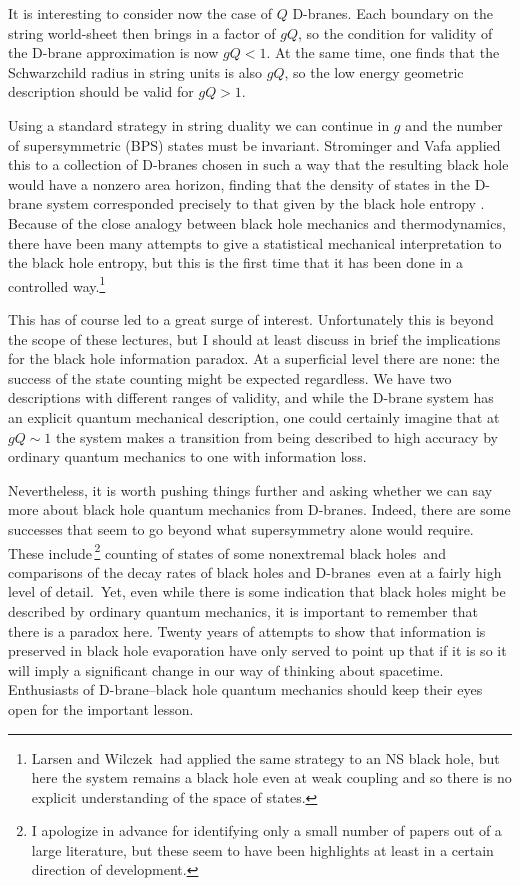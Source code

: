 \documentclass[12pt]{article}
\begin{document}
It is interesting to consider now the case of $Q$ D-branes.  Each boundary on
the string world-sheet then brings in a factor of $gQ$, so the condition for
validity of the D-brane approximation is now $gQ < 1$.  At the same time, one
finds that the Schwarzchild radius in string units is also $gQ$, so the
low energy geometric description should be valid for $gQ > 1$.

Using a standard strategy in string duality we can continue in $g$ and the
number of supersymmetric (BPS) states must be invariant.  Strominger and Vafa
applied this to a collection of D-branes chosen in such a way that the
resulting black hole would have a nonzero area horizon, finding that the
density of states in the D-brane system corresponded precisely to that given
by the black hole entropy \cite{sv}.  Because of the close analogy between
black hole mechanics and thermodynamics, there have been many attempts to
give a statistical mechanical interpretation to the black hole entropy, but
this is the first time that it has been done in a controlled way.\footnote
{Larsen and Wilczek\, \cite{larwil} had applied the same strategy to an NS black
hole, but here the system remains a black hole even at weak coupling and so
there is no explicit understanding of the space of states.}

This has of course led to a great surge of interest.  Unfortunately this
is beyond the scope of these lectures, but I should at least discuss in brief
the implications for the black hole information paradox.  At a superficial
level there are none: the success of the state counting might be expected
regardless.  We have two descriptions with different ranges of validity, and
while the D-brane system has an explicit quantum mechanical description, one
could certainly imagine that at
$gQ \sim 1$ the system makes a transition from being described to high accuracy
by ordinary quantum mechanics to one with information loss.

Nevertheless, it
is worth pushing things further and asking whether we can say more about black
hole quantum mechanics from D-branes.  Indeed, there are some successes that
seem to go beyond what supersymmetry alone would require.  These
include\,\footnote
{I apologize in advance for identifying only a small number of papers out of
a large literature, but these seem to have been highlights at least in a
certain direction of development.} counting of states of some nonextremal
black holes\, \cite{nonex} and comparisons of the decay rates of black holes and
D-branes\, \cite{decay} even at a fairly high level of detail.\, \cite{grey} 
Yet, even while there is some indication that black holes might be described by
ordinary quantum mechanics, it is important to remember that there is a paradox
here.  Twenty years of attempts to show that information is preserved in black
hole evaporation have only served to point up that if it is so it will imply
a significant change in our way of thinking about spacetime.  Enthusiasts of
D-brane--black hole quantum mechanics should keep their eyes open for the
important lesson.
\end{document}
